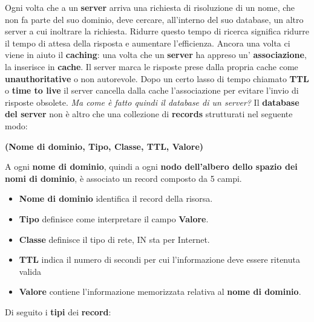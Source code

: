 \documentclass[11pt,a4paper]{article}
\theoremstyle{definition}
\begin{document}
Ogni volta che a un \textbf{server} arriva una richiesta di risoluzione di un nome, che non fa parte del suo dominio, deve cercare, all'interno del suo database, un altro server a cui inoltrare la richiesta. Ridurre questo tempo di ricerca significa ridurre il tempo di attesa della risposta e aumentare l'efficienza. Ancora una volta ci viene in aiuto il \textbf{caching}: una volta che un \textbf{server} ha appreso un' \textbf{associazione}, la inserisce in \textbf{cache}. Il server marca le risposte prese dalla propria cache come \textbf{unauthoritative} o non autorevole.
\newpage
Dopo un certo lasso di tempo chiamato \textbf{TTL} o \textbf{time to live} il server cancella dalla cache l'associazione per evitare l'invio di risposte obsolete.\newline\newline
\textit{Ma come è fatto quindi il database di un server?}\newline\newline
Il \textbf{database del server} non è altro che una collezione di \textbf{records} strutturati nel seguente modo:\newline\newline
\centerline{\textbf{(Nome di dominio, Tipo, Classe, TTL, Valore)}}\newline\newline
A ogni \textbf{nome di dominio}, quindi a ogni \textbf{nodo dell'albero dello spazio dei nomi di dominio}, è associato un record composto da 5 campi.
\begin{itemize}
	\item \textbf{Nome di dominio} identifica il record della risorsa.
	\item \textbf{Tipo} definisce come interpretare il campo \textbf{Valore}.
	\item \textbf{Classe} definisce il tipo di rete, IN sta per Internet.
	\item \textbf{TTL} indica il numero di secondi per cui l'informazione deve essere ritenuta valida
	\item \textbf{Valore} contiene l'informazione memorizzata relativa al \textbf{nome di dominio}.
\end{itemize}
Di seguito i \textbf{tipi} dei \textbf{record}:
\end{document}
